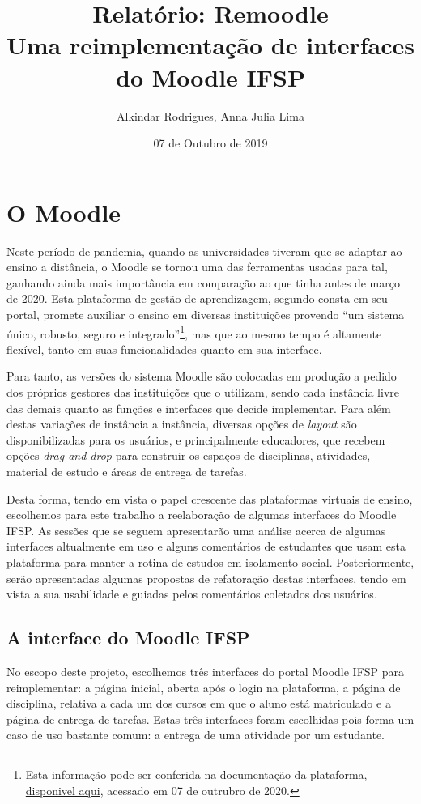 \documentclass[11pt]{article}
\author{Alkindar Rodrigues, Anna Julia Lima}
\date{07 de Outubro de 2019}
\title{Relatório: Remoodle\\\medskip
\large Uma reimplementação de interfaces do Moodle IFSP}
\begin{document}
\maketitle

\section*{O Moodle}
\label{sec:org8121ad0}
Neste período de pandemia, quando as universidades tiveram que se
adaptar ao ensino a distância, o Moodle se tornou uma das ferramentas
usadas para tal, ganhando ainda mais importância em comparação ao que
tinha antes de março de 2020.
Esta plataforma de gestão de aprendizagem, segundo consta em seu
portal, promete auxiliar o ensino em diversas instituições provendo
``um sistema único, robusto, seguro e integrado''\footnote{Esta informação pode ser conferida na documentação da
plataforma, \href{https://docs.moodle.org/39/en/About\_Moodle\#Highly\_flexible\_and\_fully\_customisable}{disponivel aqui}, acessado em 07 de outrubro de 2020.}, mas que ao mesmo
tempo é altamente flexível, tanto em suas funcionalidades quanto em
sua interface.

Para tanto, as versões do sistema Moodle são colocadas em produção
a pedido dos próprios gestores das instituições que o utilizam, sendo
cada instância livre das demais quanto as funções e interfaces
que decide implementar.
Para além destas variações de instância a instância, diversas opções
de \emph{layout} são disponibilizadas para os usuários, e principalmente
educadores, que recebem opções \emph{drag and drop} para construir os
espaços de disciplinas, atividades, material de estudo e áreas de
entrega de tarefas.

Desta forma, tendo em vista o papel crescente das plataformas virtuais
de ensino, escolhemos para este trabalho a reelaboração de algumas
interfaces do Moodle IFSP.
As sessões que se seguem apresentarão uma análise acerca de algumas
interfaces altualmente em uso e alguns comentários de estudantes que
usam esta plataforma para manter a rotina de estudos em isolamento
social.
Posteriormente, serão apresentadas algumas propostas de refatoração
destas interfaces, tendo em vista a sua usabilidade e guiadas pelos
comentários coletados dos usuários.

\subsection*{A interface do Moodle IFSP}
\label{sec:org444ffb6}
No escopo deste projeto, escolhemos três interfaces do portal Moodle
IFSP para reimplementar: a página inicial, aberta após o login na
plataforma, a página de disciplina, relativa a cada um dos cursos em
que o aluno está matriculado e a página de entrega de tarefas.  Estas
três interfaces foram escolhidas pois forma um caso de uso bastante
comum: a entrega de uma atividade por um estudante.
\end{document}
